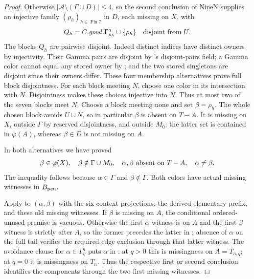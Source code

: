 \begin{proof}
Otherwise $|\mathcal A\setminus(\Gamma\cup D)|\le4$, so the second
conclusion of NineN supplies an injective family
$(\rho_h)_{h\in\operatorname{Fin}7}$ in $D$, each missing on $X$, with
\[
 Q_h=C.\mathit{good}.\Gamma^q_{\rho_h}\cup\{\rho_h\}
 \quad\hbox{disjoint from }U.
\]
The blocks $Q_h$ are pairwise disjoint. Indeed distinct indices have
distinct owners by injectivity. Their Gamma pairs are disjoint by
's disjoint-pairs field; a Gamma color cannot
equal any stored owner by ;
and the two stored singletons are disjoint since their owners differ.
These four membership alternatives prove full block disjointness.
For each block meeting $N$, choose one color in its intersection
with $N$. Disjointness makes these choices injective into $N$.
Thus at most two of the seven blocks meet $N$. Choose a block
meeting none and set $\beta=\rho_h$. The whole chosen block avoids
$U\cup N$, so in particular $\beta$ is absent on $T-A$.
It is missing on $X$, outside $\Gamma$ by reserved disjointness, and
outside $M_0$: the latter set is contained in $\overline\varphi(A)$,
whereas $\beta\in D$ is not missing on $A$.

In both alternatives we have proved
\[
 \beta\in\overline\varphi(X),\quad
 \beta\notin\Gamma\cup M_0,\quad
 \alpha,\beta\hbox{ absent on }T-A,\quad \alpha\ne\beta.
\]
The inequality follows because $\alpha\in\Gamma$ and $\beta\notin\Gamma$.
Both colors have actual missing witnesses in $B_{\rm pen}$.

Apply  to $(\alpha,\beta)$ with the six context
projections, the derived elementary prefix, and these old missing
witnesses. If $\beta$ is missing on $A$, the conditional
ordered-unused premise is vacuous. Otherwise the first $\alpha$
witness is on $A$ and the first $\beta$ witness is strictly after
$A$, so the former precedes the latter in
; absence of $\alpha$ on the full tail verifies
the required edge exclusion through that latter witness. The
avoidance clause for $\alpha\in\Gamma^q_\eta$ puts $\alpha$ in
: at $q>0$ this is missingness on
$A=T_{n,q}$; at $q=0$ it is missingness on $T_n$.
Thus the respective first or second conclusion identifies the
components through the two first missing witnesses.


\end{proof}
